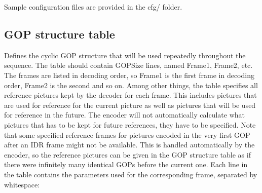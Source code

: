 \documentclass[a3paper,11pt]{jctvcdoc}
\begin{document}
Sample configuration files are provided in the cfg/ folder.

\subsection{GOP structure table}
\label{sec:gop-structure}
Defines the cyclic GOP structure that will be used repeatedly
throughout the sequence. The table should contain GOPSize lines,
named Frame1, Frame2, etc. The frames are listed in decoding
order, so Frame1 is the first frame in decoding order, Frame2 is
the second and so on. Among other things, the table specifies all
reference pictures kept by the decoder for each frame. This
includes pictures that are used for reference for the current
picture as well as pictures that will be used for reference in
the future. The encoder will not automatically calculate what
pictures that has to be kept for future references, they have to
be specified. Note that some specified reference frames for
pictures encoded in the very first GOP after an IDR frame might
not be available. This is handled automatically by the encoder,
so the reference pictures can be given in the GOP structure table
as if there were infinitely many identical GOPs before the
current one. Each line in the table contains the parameters used
for the corresponding frame, separated by whitespace:
\end{document}
